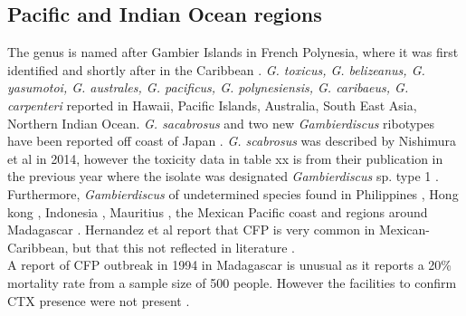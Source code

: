 \documentclass[12pt]{article}
\begin{document}
\subsection{Pacific and Indian Ocean regions}
The genus is named after Gambier Islands in French Polynesia, where it was first identified \cite{adachi1979thecal} and shortly after in the Caribbean \cite{besada1982observations}.
\emph{G. toxicus, G. belizeanus, G. yasumotoi, G. australes, G. pacificus, G. polynesiensis, G. caribaeus, G. carpenteri} reported in Hawaii, Pacific Islands, Australia, South East Asia, Northern Indian Ocean.
\emph{G. sacabrosus} and two new \emph{Gambierdiscus} ribotypes have been reported off coast of Japan \cite{nishimura2013genetic,nishimura2014morphology}. \emph{G. scabrosus} was described by Nishimura et al in 2014, however the toxicity data in table xx is from their publication in the previous year where the isolate was designated \emph{Gambierdiscus} sp. type 1 \cite{nishimura2013genetic,nishimura2014morphology}. \\
Furthermore, \emph{Gambierdiscus} of undetermined species found in Philippines \cite{gillespie1987possible}, Hong kong \cite{lu2004harmful}, Indonesia \cite{praseno1996hab}, Mauritius \cite{hurbungs2002seasonal}, the Mexican Pacific coast \cite{ceballos2006analisis} and regions around Madagascar \cite{grzebyk1994ecology}. Hernandez et al report that CFP is very common in Mexican-Caribbean, but that this not reflected in literature \cite{hernandez2004species}.\\
A report of CFP outbreak in 1994 in Madagascar is unusual as it reports a 20\% mortality rate from a sample size of 500 people. However the facilities to confirm CTX presence were not present \cite{habermehl1994severe}. 
\end{document}
